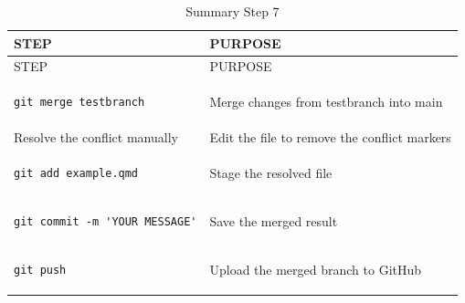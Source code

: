 \documentclass[
  11pt,
  a4paper,
]{article}
\begin{document}
\begin{longtable}[]{@{}
  >{\raggedright\arraybackslash}p{}
  >{\raggedright\arraybackslash}p{}@{}}
\caption{Summary Step 7}\tabularnewline
\toprule\noalign{}
\begin{minipage}[b]{\linewidth}\raggedright
STEP
\end{minipage} & \begin{minipage}[b]{\linewidth}\raggedright
PURPOSE
\end{minipage} \\
\midrule\noalign{}
\endfirsthead
\toprule\noalign{}
\begin{minipage}[b]{\linewidth}\raggedright
STEP
\end{minipage} & \begin{minipage}[b]{\linewidth}\raggedright
PURPOSE
\end{minipage} \\
\midrule\noalign{}
\endhead
\bottomrule\noalign{}
\endlastfoot
\begin{minipage}[t]{\linewidth}\raggedright
\begin{verbatim}
git merge testbranch
\end{verbatim}
\end{minipage} & Merge changes from testbranch into main \\
Resolve the conflict manually & Edit the file to remove the conflict
markers \\
\begin{minipage}[t]{\linewidth}\raggedright
\begin{verbatim}
git add example.qmd
\end{verbatim}
\end{minipage} & Stage the resolved file \\
\begin{minipage}[t]{\linewidth}\raggedright
\begin{verbatim}
git commit -m 'YOUR MESSAGE'
\end{verbatim}
\end{minipage} & Save the merged result \\
\begin{minipage}[t]{\linewidth}\raggedright
\begin{verbatim}
git push
\end{verbatim}
\end{minipage} & Upload the merged branch to GitHub \\
\end{longtable}
\end{document}
